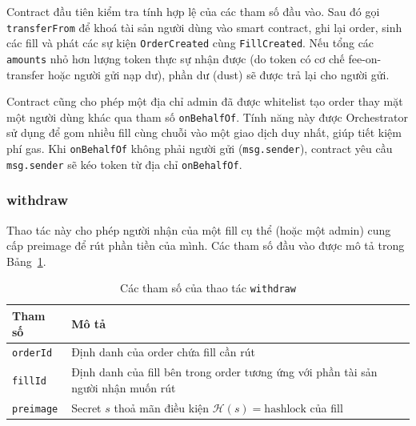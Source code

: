 Contract đầu tiên kiểm tra tính hợp lệ của các tham số đầu vào.
Sau đó gọi \texttt{transferFrom} để khoá tài sản người dùng vào smart contract,
ghi lại order, sinh các fill và phát các sự kiện \texttt{OrderCreated} cùng
\texttt{FillCreated}. Nếu tổng các \texttt{amounts} nhỏ hơn lượng token thực
sự nhận được (do token có cơ chế fee-on-transfer hoặc người gửi nạp dư),
phần dư (dust) sẽ được trả lại cho người gửi.

Contract cũng cho phép một địa chỉ admin đã được whitelist
tạo order thay mặt một người dùng khác qua tham số
\texttt{onBehalfOf}. Tính năng này được Orchestrator sử dụng 
để gom nhiều fill cùng chuỗi vào một giao dịch duy nhất, 
giúp tiết kiệm phí gas. Khi \texttt{onBehalfOf} không phải người gửi (\texttt{msg.sender}), contract yêu cầu \texttt{msg.sender} sẽ kéo token từ địa chỉ \texttt{onBehalfOf}.

\subsubsection*{withdraw}

Thao tác này cho phép người nhận của một fill cụ thể (hoặc một admin) cung cấp
preimage để rút phần tiền của mình. Các tham số đầu vào được mô tả trong
Bảng~\ref{tab:withdraw-params}.

\begin{table}[H]
    \centering
    \caption{Các tham số của thao tác \texttt{withdraw}}
    \label{tab:withdraw-params}
    \begin{tabular}{|l|p{10cm}|}
        \hline
        \textbf{Tham số} & \textbf{Mô tả} \\
        \hline
        \texttt{orderId} & Định danh của order chứa fill cần rút \\
        \hline
        \texttt{fillId} & Định danh của fill bên trong order tương ứng với phần tài sản người nhận muốn rút \\
        \hline
        \texttt{preimage} & Secret $s$ thoả mãn điều kiện $\mathcal{H}(s) = \text{hashlock}$ của fill \\
        \hline
    \end{tabular}
\end{table}

